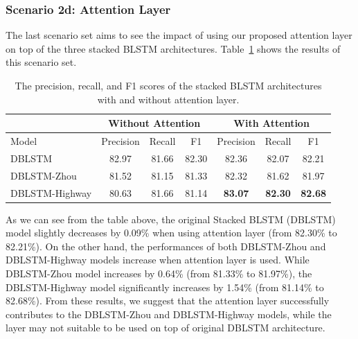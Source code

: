 \subsubsection{Scenario 2d: Attention Layer}
The last scenario set aims to see the impact of using our proposed attention layer on top of the three stacked BLSTM architectures. Table~\ref{tab:modelselection4} shows the results of this scenario set.

\begin{table}
	\caption{The precision, recall, and F1 scores of the stacked BLSTM architectures with and without attention layer.}
	\centering
	\label{tab:modelselection4}
	\begin{tabular}{|l|ccc|ccc|}
		\hline
		& \multicolumn{3}{c}{ Without Attention } & \multicolumn{3}{c}{ With Attention } \\
		\hline
		Model & Precision & Recall & F1 & Precision & Recall & F1 \\
		\hline \hline
		DBLSTM & 82.97 & 81.66 & 82.30 & 82.36 & 82.07 & 82.21 \\
		DBLSTM-Zhou & 81.52 & 81.15 & 81.33 & 82.32 & 81.62 & 81.97 \\
		DBLSTM-Highway & 80.63 & 81.66 & 81.14 & \textbf{83.07} & \textbf{82.30} & \textbf{82.68} \\
		\hline
	\end{tabular}

\end{table}

As we can see from the table above, the original Stacked BLSTM (DBLSTM) model slightly decreases by 0.09\% when using attention layer (from 82.30\% to 82.21\%). On the other hand, the performances of both DBLSTM-Zhou and DBLSTM-Highway models increase when attention layer is used. While DBLSTM-Zhou model increases by 0.64\% (from 81.33\% to 81.97\%), the DBLSTM-Highway model significantly increases by 1.54\% (from 81.14\% to 82.68\%). From these results, we suggest that the attention layer successfully contributes to the DBLSTM-Zhou and DBLSTM-Highway models, while the layer may not suitable to be used on top of original DBLSTM architecture.


